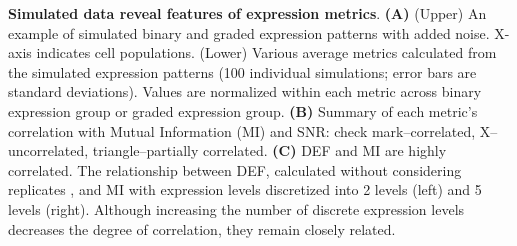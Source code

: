 \textbf{Simulated data reveal features of expression metrics}.
\textbf{(A)} (Upper) An example of simulated binary and graded expression patterns with added noise. X-axis indicates cell populations. (Lower) Various average metrics calculated from the simulated expression patterns (100 individual simulations; error bars are standard deviations). Values are normalized within each metric across binary expression group or graded expression group. 
\textbf{(B)} Summary of each metric's correlation with Mutual Information (MI) and SNR: check mark--correlated, X--uncorrelated, triangle--partially correlated.
\textbf{(C)} DEF and MI are highly correlated. The relationship between DEF, calculated without considering replicates%
, and MI with expression levels discretized into 2 levels (left) and 5 levels (right). Although increasing the number of discrete expression levels decreases the degree of correlation, they remain closely related.

